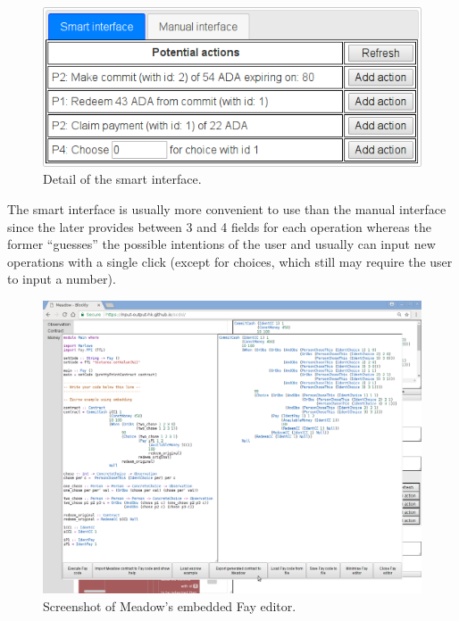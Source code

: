 \documentclass[runningheads]{llncs}
\begin{document}
\begin{figure}
\centering{}\includegraphics[scale=0.5]{pix/detail4}\caption{\label{fig:detail-of-smart-interface}Detail of the smart 
interface.}
\end{figure}

The smart interface is usually more convenient to use than the manual
interface since the later provides between 3 and 4 fields for each
operation whereas the former ``guesses'' the possible intentions
of the user and usually can input new operations with a single click 
(except for choices, which still may require the user to input a number).

\begin{figure}
\begin{centering}
\includegraphics[width=1\textwidth]{pix/embedded.png}
\par\end{centering}
\caption{\label{fig:embedded-demo}Screenshot of Meadow's embedded Fay editor.}
\end{figure}
\end{document}
